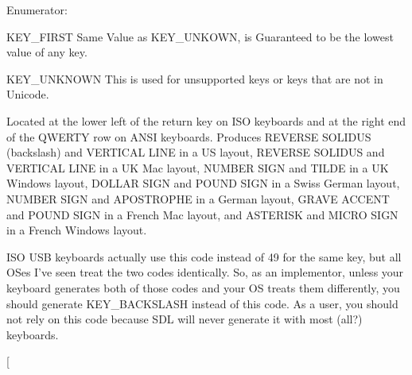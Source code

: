 \begin{Desc}
\item[Enumerator: ]\par
\begin{description}
\item[{\em 
\hypertarget{classphys_1_1MetaCode_a3e501cbb5bf0f6f1fdb7211465bda8d8a45d7f3824a440f5bea5e616a6d6ea0b5}{
KEY\_\-FIRST}
\label{da/dc9/classphys_1_1MetaCode_a3e501cbb5bf0f6f1fdb7211465bda8d8a45d7f3824a440f5bea5e616a6d6ea0b5}
}]KEY\_\-FIRST Same Value as KEY\_\-UNKOWN, is Guaranteed to be the lowest value of any key. \item[{\em 
\hypertarget{classphys_1_1MetaCode_a3e501cbb5bf0f6f1fdb7211465bda8d8a061a36c9b5d9661314fd9d276b33042f}{
KEY\_\-UNKNOWN}
\label{da/dc9/classphys_1_1MetaCode_a3e501cbb5bf0f6f1fdb7211465bda8d8a061a36c9b5d9661314fd9d276b33042f}
}]KEY\_\-UNKNOWN This is used for unsupported keys or keys that are not in Unicode. \item[{\em 
\hypertarget{classphys_1_1MetaCode_a3e501cbb5bf0f6f1fdb7211465bda8d8acab0c272975d1667521cd5ae918e9b8e}{
KEY\_\-BACKSLASH}
\label{da/dc9/classphys_1_1MetaCode_a3e501cbb5bf0f6f1fdb7211465bda8d8acab0c272975d1667521cd5ae918e9b8e}
}]Located at the lower left of the return key on ISO keyboards and at the right end of the QWERTY row on ANSI keyboards. Produces REVERSE SOLIDUS (backslash) and VERTICAL LINE in a US layout, REVERSE SOLIDUS and VERTICAL LINE in a UK Mac layout, NUMBER SIGN and TILDE in a UK Windows layout, DOLLAR SIGN and POUND SIGN in a Swiss German layout, NUMBER SIGN and APOSTROPHE in a German layout, GRAVE ACCENT and POUND SIGN in a French Mac layout, and ASTERISK and MICRO SIGN in a French Windows layout. \item[{\em 
\hypertarget{classphys_1_1MetaCode_a3e501cbb5bf0f6f1fdb7211465bda8d8afd23349e045ee52f42e1c5c25ee3cec3}{
KEY\_\-NONUSHASH}
\label{da/dc9/classphys_1_1MetaCode_a3e501cbb5bf0f6f1fdb7211465bda8d8afd23349e045ee52f42e1c5c25ee3cec3}
}]ISO USB keyboards actually use this code instead of 49 for the same key, but all OSes I've seen treat the two codes identically. So, as an implementor, unless your keyboard generates both of those codes and your OS treats them differently, you should generate KEY\_\-BACKSLASH instead of this code. As a user, you should not rely on this code because SDL will never generate it with most (all?) keyboards. \item[{\em 
}
\end{description}
\end{Desc}
